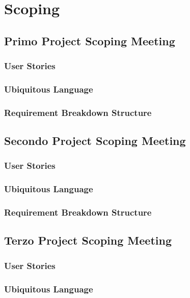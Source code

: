 \chapter{Scoping}

\section{Primo Project Scoping Meeting}

\subsection{User Stories}

\subsection{Ubiquitous Language}

\subsection{Requirement Breakdown Structure}

\section{Secondo Project Scoping Meeting}

\subsection{User Stories}

\subsection{Ubiquitous Language}

\subsection{Requirement Breakdown Structure}

\section{Terzo Project Scoping Meeting}

\subsection{User Stories}

\subsection{Ubiquitous Language}

